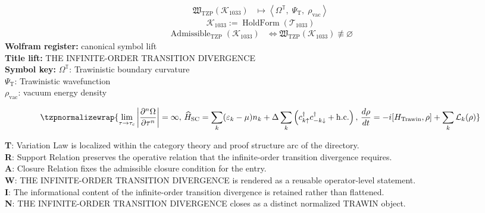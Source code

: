 \noindent
\begin{minipage}[t]{0.48\linewidth}
\begingroup
\small
\[
\begin{aligned}
\mathfrak{W}_{\mathrm{TZP}}\!\left(\mathcal{K}_{1033}\right)
&\longmapsto
\left\langle \Omega^{\mathbb{T}},\; \Psi_{\mathrm{T}},\; \rho_{\mathrm{vac}} \right\rangle
\end{aligned}
\]
\[
\mathcal{K}_{1033}
:=
\operatorname{HoldForm}\!\left(\mathcal{T}_{1033}\right)
\]
\[
\begin{aligned}
\operatorname{Admissible}_{\mathrm{TZP}}\!\left(\mathcal{K}_{1033}\right)
&\Longleftrightarrow
\mathfrak{W}_{\mathrm{TZP}}\!\left(\mathcal{K}_{1033}\right)\not\equiv\varnothing
\end{aligned}
\]
\textbf{Wolfram register:} canonical symbol lift\\
\textbf{Title lift:} THE INFINITE-ORDER TRANSITION DIVERGENCE\\
\textbf{Symbol key:} \(\Omega^{\mathbb{T}}\): Trawinistic boundary curvature\\ \(\Psi_{\mathrm{T}}\): Trawinistic wavefunction\\ \(\rho_{\mathrm{vac}}\): vacuum energy density
\par
\endgroup
\end{minipage}\hfill
\begin{minipage}[t]{0.48\linewidth}
\[
\tzpnormalizewrap{\lim_{\tau\to\tau_c}\left|\frac{\partial^n\Omega}{\partial\tau^n}\right|=\infty,\,\widehat{H}_{\mathrm{SC}}=\sum_k(\varepsilon_k-\mu)n_k+\Delta\sum_k\left(c^\dagger_{k\uparrow}c^\dagger_{-k\downarrow}+\mathrm{h.c.}\right),\,\frac{d\rho}{dt}=-i[H_{\mathrm{Trawin}},\rho]+\sum_k\mathcal{L}_k(\rho)}
\]

\small
\textbf{T}: Variation Law is localized within the category theory and proof structure arc of the directory.\\
\textbf{R}: Support Relation preserves the operative relation that the infinite-order transition divergence requires.\\
\textbf{A}: Closure Relation fixes the admissible closure condition for the entry.\\
\textbf{W}: THE INFINITE-ORDER TRANSITION DIVERGENCE is rendered as a reusable operator-level statement.\\
\textbf{I}: The informational content of the infinite-order transition divergence is retained rather than flattened.\\
\textbf{N}: THE INFINITE-ORDER TRANSITION DIVERGENCE closes as a distinct normalized TRAWIN object.
\normalsize
\end{minipage}


